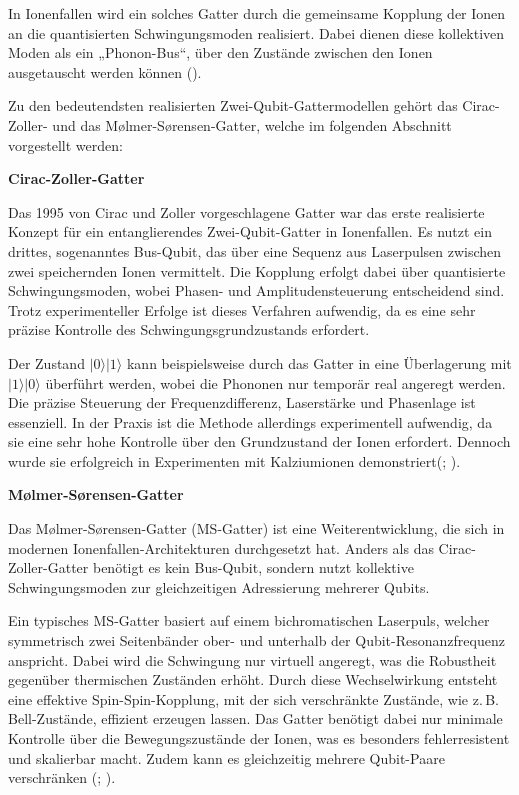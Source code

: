 In Ionenfallen wird ein solches Gatter durch die gemeinsame Kopplung der Ionen an die quantisierten Schwingungsmoden realisiert. Dabei dienen diese kollektiven Moden als ein „Phonon-Bus“, über den Zustände zwischen den Ionen ausgetauscht werden können (\cite{baumann_ionenfallen-quantencomputer_2025}).

Zu den bedeutendsten realisierten Zwei-Qubit-Gattermodellen gehört das Cirac-Zoller- und das Mølmer-Sørensen-Gatter, welche im folgenden Abschnitt vorgestellt werden:

\newpage
\textbf{Cirac-Zoller-Gatter} 


Das 1995 von Cirac und Zoller vorgeschlagene Gatter war das erste realisierte Konzept für ein entanglierendes Zwei-Qubit-Gatter in Ionenfallen. Es nutzt ein drittes, sogenanntes Bus-Qubit, das über eine Sequenz aus Laserpulsen zwischen zwei speichernden Ionen vermittelt. Die Kopplung erfolgt dabei über quantisierte Schwingungsmoden, wobei Phasen- und Amplitudensteuerung entscheidend sind. Trotz experimenteller Erfolge ist dieses Verfahren aufwendig, da es eine sehr präzise Kontrolle des Schwingungsgrundzustands erfordert.

Der Zustand \( \lvert 0 \rangle \lvert 1 \rangle \) kann beispielsweise durch das Gatter in eine Überlagerung mit \( \lvert 1 \rangle \lvert 0 \rangle \) überführt werden, wobei die Phononen nur temporär real angeregt werden. Die präzise Steuerung der Frequenzdifferenz, Laserstärke und Phasenlage ist essenziell. In der Praxis ist die Methode allerdings experimentell aufwendig, da sie eine sehr hohe Kontrolle über den Grundzustand der Ionen erfordert. Dennoch wurde sie erfolgreich in Experimenten mit Kalziumionen demonstriert(\cite{cirac_quantum_1995}; \cite{baumann_ionenfallen-quantencomputer_2025}).

\textbf{Mølmer-Sørensen-Gatter} 


Das Mølmer-Sørensen-Gatter (MS-Gatter) ist eine Weiterentwicklung, die sich in modernen Ionenfallen-Architekturen durchgesetzt hat. Anders als das Cirac-Zoller-Gatter benötigt es kein Bus-Qubit, sondern nutzt kollektive Schwingungsmoden zur gleichzeitigen Adressierung mehrerer Qubits.

Ein typisches MS-Gatter basiert auf einem bichromatischen Laserpuls, welcher symmetrisch zwei Seitenbänder ober- und unterhalb der Qubit-Resonanzfrequenz anspricht. Dabei wird die Schwingung nur virtuell angeregt, was die Robustheit gegenüber thermischen Zuständen erhöht. Durch diese Wechselwirkung entsteht eine effektive Spin-Spin-Kopplung, mit der sich verschränkte Zustände, wie z.\,B. Bell-Zustände, effizient erzeugen lassen. Das Gatter benötigt dabei nur minimale Kontrolle über die Bewegungszustände der Ionen, was es besonders fehlerresistent und skalierbar macht. Zudem kann es gleichzeitig mehrere Qubit-Paare verschränken (\cite{sorensen_entanglement_2000}; \cite{baumann_ionenfallen-quantencomputer_2025}).

